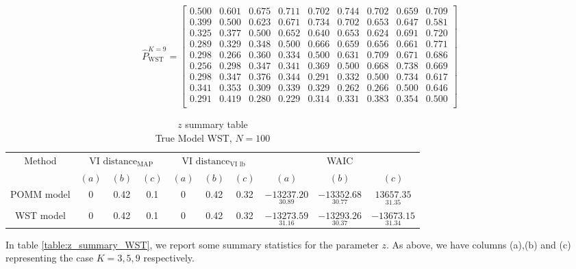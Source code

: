\documentclass[11pt]{amsart}
\begin{document}
\[ 
\hat{P}^{K=9}_{\text{WST}} = 
\left[\begin{array}{ccccccccc}
0.500 & 0.601 & 0.675 & 0.711 & 0.702 & 0.744 & 0.702 & 0.659 & 0.709 \\
0.399 & 0.500 & 0.623 & 0.671 & 0.734 & 0.702 & 0.653 & 0.647 & 0.581 \\
0.325 & 0.377 & 0.500 & 0.652 & 0.640 & 0.653 & 0.624 & 0.691 & 0.720 \\
0.289 & 0.329 & 0.348 & 0.500 & 0.666 & 0.659 & 0.656 & 0.661 & 0.771 \\
0.298 & 0.266 & 0.360 & 0.334 & 0.500 & 0.631 & 0.709 & 0.671 & 0.686 \\
0.256 & 0.298 & 0.347 & 0.341 & 0.369 & 0.500 & 0.668 & 0.738 & 0.669 \\
0.298 & 0.347 & 0.376 & 0.344 & 0.291 & 0.332 & 0.500 & 0.734 & 0.617 \\
0.341 & 0.353 & 0.309 & 0.339 & 0.329 & 0.262 & 0.266 & 0.500 & 0.646 \\
0.291 & 0.419 & 0.280 & 0.229 & 0.314 & 0.331 & 0.383 & 0.354 & 0.500 \\\end{array}\right]
\]


\begin{table}[htbp]
\centering
\caption{
{\large $z$ summary table} \\ 
{\small True Model WST, $N=100$}
} 
\begin{tabular}{cccccccccc}
\toprule
\multirow{2}{*}{Method} & \multicolumn{3}{c}{
VI $\text{distance}_{\text{MAP}}$} & \multicolumn{3}{c}{
VI $\text{distance}_{\text{VI lb}}$} & \multicolumn{3}{c}{WAIC} \\
\cmidrule(lr){2-4} \cmidrule(lr){5-7} \cmidrule(lr){8-10}
& $(a)$ & $(b)$ & $(c)$ & $(a)$ & $(b)$ & $(c)$ & $(a)$ & $(b)$ & $(c)$ \\
\midrule
POMM model  &0 & 0.42 & 0.1 & 0 & 0.42 & 0.32   & $\underset{30.89}{-13237.20}$ & $\underset{30.77}{-13352.68}$ & $\underset{31.35}{13657.35}$  \\
WST model &0 & 0.42 & 0.1 & 0 & 0.42 & 0.32  & $\underset{31.16}{-13273.59}$ & $\underset{ 30.37}{-13293.26}$ & $\underset{31.34}{-13673.15}$ \\
\bottomrule
\end{tabular}
\label{table:z_summary_WST}
\end{table}

In table \eqref{table:z_summary_WST}, we report some summary statistics for the parameter $z$. As above, we have columns (a),(b) and (c) representing the case $K=3,5,9$ respectively.
\end{document}
